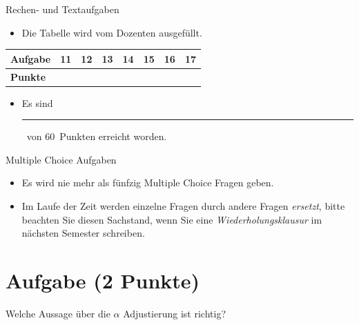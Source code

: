 \documentclass[a4paper, 10pt]{scrartcl}\usepackage[]{graphicx}\usepackage[]{xcolor}
\def\textpoints{60}
\begin{document}
\begin{graybox}{Rechen- und Textaufgaben}
  \begin{itemize}
  \item Die Tabelle wird vom Dozenten ausgefüllt.
  \end{itemize}
  \begin{center}
    \large
    \begin{tabular}{|l|c|c|c|c|c|c|c|}
      \hline
      \textbf{Aufgabe} & 11 & 12 & 13 & 14 & 15 & 16 & 17 \strut\\
      \hline
      \textbf{Punkte} & \phantom{1111}  & \phantom{1212}  & \phantom{1313}  & \phantom{1414}  & \phantom{1515}  & \phantom{1616}  & \phantom{1717}
                                                                                                                                    \strut\\
      \hline
  \end{tabular}
\end{center}
\begin{itemize}
\item Es sind \rule[0ex]{2em}{.4pt}\, von \textpoints\, Punkten erreicht worden.
\end{itemize}
\end{graybox}

\clearpage
\begin{graybox}{Multiple Choice Aufgaben}
  \begin{itemize}
  \item Es wird nie mehr als fünfzig Multiple Choice Fragen geben.
  \item Im Laufe der Zeit werden einzelne Fragen durch andere Fragen \textit{ersetzt}, bitte beachten Sie diesen Sachstand, wenn Sie eine \textit{Wiederholungsklausur} im nächsten Semester schreiben. 
  \end{itemize}
\end{graybox}
    

\section{Aufgabe \hfill (2 Punkte)}



Welche Aussage {\"u}ber die \textbf{$\alpha$} Adjustierung ist richtig?
\end{document}
